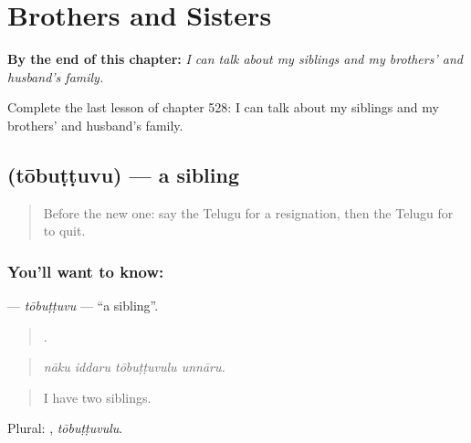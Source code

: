 
\chapter{Brothers and Sisters}
\label{ch:te-brothers-and-sisters}

\begin{chapteropening}
\textbf{By the end of this chapter:} \emph{I can talk about my siblings and my brothers' and husband's family.}

Complete the last lesson of chapter 528: I can talk about my siblings and my brothers' and husband's family.
\end{chapteropening}

\section[\texorpdfstring{\te{తోబుట్టువు} (tōbuṭṭuvu)}{తోబుట్టువు (tōbuṭṭuvu)}]{ (tōbuṭṭuvu) — a sibling}

\label{lesson:TE-C528-tobuttuvu}



\begin{quote}
Before the new one: say the Telugu for a resignation, then the Telugu for to quit.
\end{quote}

\subsection*{You'll want to know: }
\textbf{} — \emph{tōbuṭṭuvu} — \textquotedblleft{}a sibling\textquotedblright{}.

\begin{quote}
   .
\end{quote}

\begin{quote}
\emph{nāku iddaru tōbuṭṭuvulu unnāru.}
\end{quote}

\begin{quote}
I have two siblings.
\end{quote}

Plural: , \emph{tōbuṭṭuvulu}.

